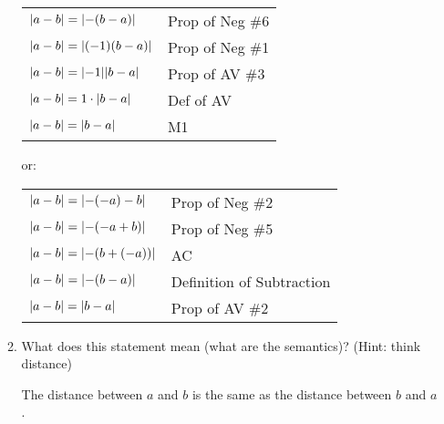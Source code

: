 \documentclass[letterpaper,12pt,fleqn]{article}
\begin{document}
\begin{enumerate}
\begin{enumerate}
    \begin{tabular}{ll}
      $\lvert a-b\rvert=\lvert-(b-a)\rvert$ & Prop of Neg \#6 \\
      $\lvert a-b\rvert=\lvert(-1)(b-a)\rvert$ & Prop of Neg \#1 \\
      $\lvert a-b\rvert=\lvert-1\rvert\lvert b-a\rvert$ & Prop of AV \#3 \\
      $\lvert a-b\rvert=1\cdot\lvert b-a\rvert$ & Def of AV \\
      $\lvert a-b\rvert=\lvert b-a\rvert$ & M1 \\
    \end{tabular}

    or:

    \begin{tabular}{ll}
      $\lvert a-b\rvert=\lvert-(-a)-b\rvert$ & Prop of Neg \#2 \\
      $\lvert a-b\rvert=\lvert-(-a+b)\rvert$ & Prop of Neg \#5 \\
      $\lvert a-b\rvert=\lvert-(b+(-a))\rvert$ & AC \\
      $\lvert a-b\rvert=\lvert-(b-a)\rvert$ & Definition of Subtraction \\
      $\lvert a-b\rvert=\lvert b-a\rvert$ & Prop of AV \#2 \\
    \end{tabular}

  \item What does this statement mean (what are the semantics)? (Hint: think
    distance)

    The distance between $a$ and $b$ is the same as the distance between
    $b$ and $a$.
  \end{enumerate}
\end{enumerate}
\end{document}
